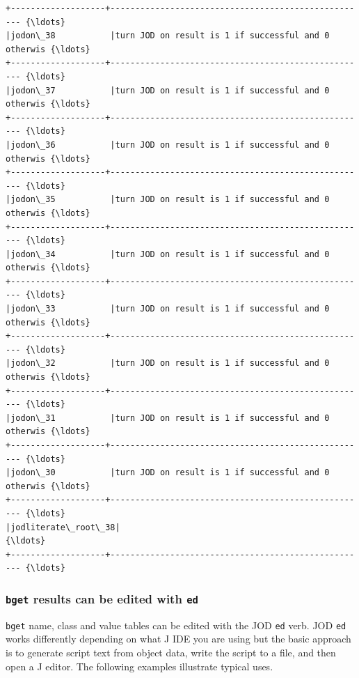 \documentclass[11pt,letter,landscape]{article}
\begin{document}
    \begin{Verbatim}[commandchars=\\\{\}]
+-------------------+---------------------------------------------------- {\ldots}
|jodon\_38           |turn JOD on result is 1 if successful and 0 otherwis {\ldots}
+-------------------+---------------------------------------------------- {\ldots}
|jodon\_37           |turn JOD on result is 1 if successful and 0 otherwis {\ldots}
+-------------------+---------------------------------------------------- {\ldots}
|jodon\_36           |turn JOD on result is 1 if successful and 0 otherwis {\ldots}
+-------------------+---------------------------------------------------- {\ldots}
|jodon\_35           |turn JOD on result is 1 if successful and 0 otherwis {\ldots}
+-------------------+---------------------------------------------------- {\ldots}
|jodon\_34           |turn JOD on result is 1 if successful and 0 otherwis {\ldots}
+-------------------+---------------------------------------------------- {\ldots}
|jodon\_33           |turn JOD on result is 1 if successful and 0 otherwis {\ldots}
+-------------------+---------------------------------------------------- {\ldots}
|jodon\_32           |turn JOD on result is 1 if successful and 0 otherwis {\ldots}
+-------------------+---------------------------------------------------- {\ldots}
|jodon\_31           |turn JOD on result is 1 if successful and 0 otherwis {\ldots}
+-------------------+---------------------------------------------------- {\ldots}
|jodon\_30           |turn JOD on result is 1 if successful and 0 otherwis {\ldots}
+-------------------+---------------------------------------------------- {\ldots}
|jodliterate\_root\_38|                                                     {\ldots}
+-------------------+---------------------------------------------------- {\ldots}
    \end{Verbatim}

    \hypertarget{bget-results-can-be-edited-with-ed}{%
\subsubsection{\texorpdfstring{\texttt{bget} results can be edited with
\texttt{ed}}{bget results can be edited with ed}}\label{bget-results-can-be-edited-with-ed}}

\texttt{bget} name, class and value tables can be edited with the JOD
\texttt{ed} verb. JOD \texttt{ed} works differently depending on what J
IDE you are using but the basic approach is to generate script text from
object data, write the script to a file, and then open a J editor. The
following examples illustrate typical uses.
\end{document}
